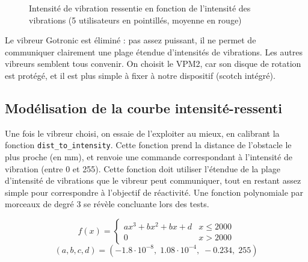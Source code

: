 \documentclass[a4paper, 11pt]{article}
\begin{document}
\begin{figure}[H]
{\begin{tikzpicture}
\end{tikzpicture}}
\quad
{}
\caption{Intensité de vibration ressentie en fonction de l’intensité des vibrations (5 utilisateurs en pointillés, moyenne en rouge)}
\end{figure}

\par Le vibreur Gotronic est éliminé : pas assez puissant, il ne permet de communiquer clairement une plage étendue d'intensités de vibrations. Les autres vibreurs semblent tous convenir. On choisit le VPM2, car son disque de rotation est protégé, et il est plus simple à fixer à notre dispositif (scotch intégré).


\subsection{Modélisation de la courbe intensité-ressenti}

\par Une fois le vibreur choisi, on essaie de l'exploiter au mieux, en calibrant la fonction \lstinline+dist_to_intensity+. Cette fonction prend la distance de l'obstacle le plus proche (en mm), et renvoie une commande correspondant à l'intensité de vibration (entre 0 et 255). Cette fonction doit utiliser l'étendue de la plage d'intensité de vibrations que le vibreur peut communiquer, tout en restant assez simple pour correspondre à l'objectif de réactivité. Une fonction polynomiale par morceaux de degré 3 se révèle concluante lors des tests.
 
\begin{equation}
f(x) =
\begin{cases}
    a x^3 + b x^2 + b x + d & x \leq 2000 \\
    0 & x > 2000
\end{cases}
\end{equation}
\[
    (a, b, c, d) =  (-1.8 \cdot 10^{-8}, \; 1.08 \cdot 10^{-4}, \; -0.234, \; 255)
\]
\end{document}
